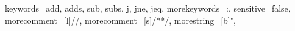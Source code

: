 {
    keywords={add, adds, sub, subs, j, jne, jeq},
    morekeywords={:},
    sensitive=false,
    morecomment=[l]{//},
    morecomment=[s]{/*}{*/},
    morestring=[b]",
}


